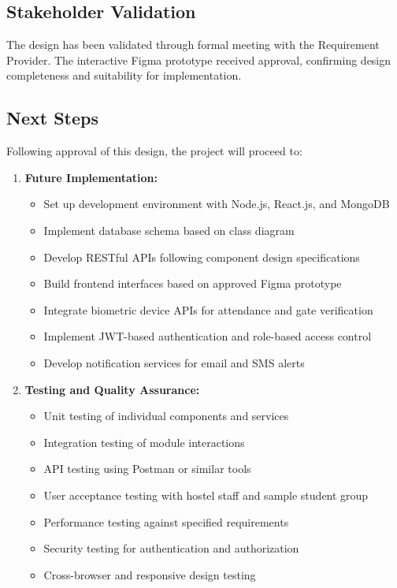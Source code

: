 \documentclass[12pt]{article}
\begin{document}
\subsection{Stakeholder Validation}

The design has been validated through formal meeting with the Requirement Provider. The interactive Figma prototype received approval, confirming design completeness and suitability for implementation.

\subsection{Next Steps}

Following approval of this design, the project will proceed to:

\begin{enumerate}
\item \textbf{Future Implementation:}
\begin{itemize}
\item Set up development environment with Node.js, React.js, and MongoDB
\item Implement database schema based on class diagram
\item Develop RESTful APIs following component design specifications
\item Build frontend interfaces based on approved Figma prototype
\item Integrate biometric device APIs for attendance and gate verification
\item Implement JWT-based authentication and role-based access control
\item Develop notification services for email and SMS alerts
\end{itemize}

\item \textbf{Testing and Quality Assurance:}
\begin{itemize}
\item Unit testing of individual components and services
\item Integration testing of module interactions
\item API testing using Postman or similar tools
\item User acceptance testing with hostel staff and sample student group
\item Performance testing against specified requirements
\item Security testing for authentication and authorization
\item Cross-browser and responsive design testing
\end{itemize}


\end{enumerate}
\end{document}

